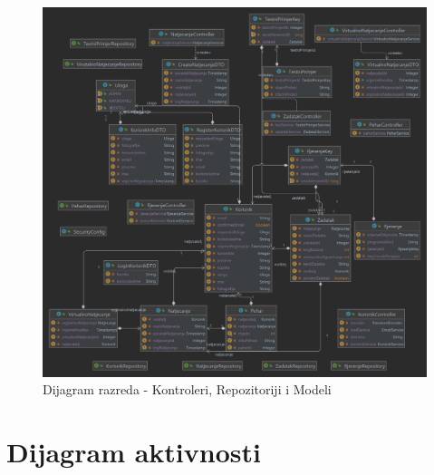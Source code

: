\begin{figure}[H]
	\includegraphics[scale=0.2]{dijagrami/apiDiagram.png}
	\centering
	\caption{Dijagram razreda - Kontroleri, Repozitoriji i Modeli}
	\label{fig:dijagramRazreda2}
\end{figure}

%
%
%
%
%
%
%
%
%
%
%
\section{Dijagram aktivnosti}

